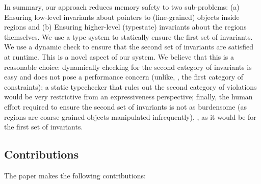 In summary, our approach reduces memory safety to two sub-problems:
(a) Ensuring  low-level invariants about pointers to (fine-grained) objects inside regions and 
(b) Ensuring higher-level (typestate) invariants about the regions themselves. 
We use a type system to statically ensure the first set of invariants. We use a dynamic check to ensure that the
second set of invariants are satisfied at runtime.
%
This is a novel aspect of our system. We believe that this is a reasonable choice:
dynamically checking for the second category of invariants is easy and does not pose a performance concern (unlike, \eg, the first category of constraints);
a static typechecker that rules out the second category of violations would be very restrictive from an expressiveness perspective;
finally, the human effort required to ensure the second set of invariants is not as burdensome (as regions are coarse-grained objects
manipulated infrequently), \eg, as it would be for the first set of invariants.

\subsection*{Contributions}

The paper makes the following contributions:

